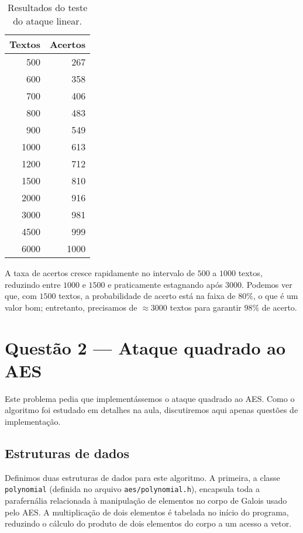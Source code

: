 \documentclass{article}
\begin{document}
\begin{table}
    \center
    \begin{tabular}{r r}
        \toprule
        Textos & Acertos \\
        \midrule
        500 & 267 \\
        600 & 358 \\
        700 & 406 \\
        800 & 483 \\
        900 & 549 \\
        1000 & 613 \\
        1200 & 712 \\
        1500 & 810 \\
        2000 & 916 \\
        3000 & 981 \\
        4500 & 999 \\
        6000 & 1000 \\
        \bottomrule
    \end{tabular}
    \caption{
        Resultados do teste do ataque linear.
    }
    \label{linear}
\end{table}

A taxa de acertos cresce rapidamente no intervalo de $500$ a $1000$ textos,
reduzindo entre $1000$ e $1500$ e praticamente estagnando após $3000$.
Podemos ver que, com $1500$ textos, a probabilidade de acerto
está na faixa de $80\%$, o que é um valor bom;
entretanto, precisamos de $\approx 3000$ textos para garantir $98\%$ de acerto.

\section{Questão 2 --- Ataque quadrado ao AES}

Este problema pedia que implementássemos o ataque quadrado ao AES.
Como o algoritmo foi estudado em detalhes na aula,
discutiremos aqui apenas questões de implementação.

\subsection{Estruturas de dados}

Definimos duas estruturas de dados para este algoritmo.
A primeira,
a classe \verb"polynomial"
(definida no arquivo \verb"aes/polynomial.h"),
encapsula toda a parafernália relacionada
à manipulação de elementos no corpo de Galois usado pelo AES.
A multiplicação de dois elementos é tabelada no início do programa,
reduzindo o cálculo do produto de dois elementos do corpo
a um acesso a vetor.
\end{document}
